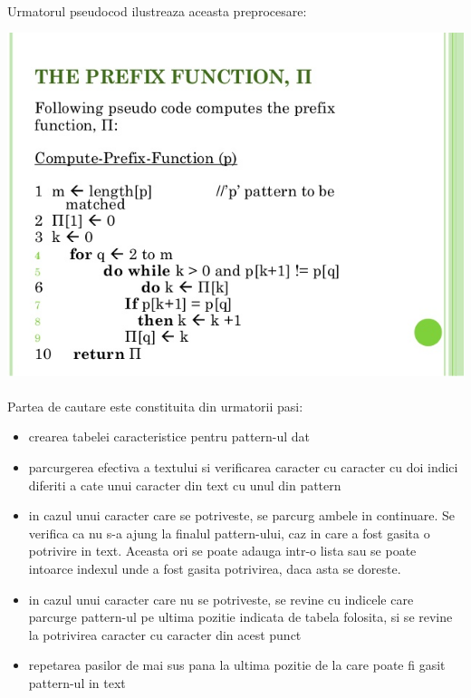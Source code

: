 \documentclass[runningheads]{llncs}
\begin{document}
\paragraph{} Urmatorul pseudocod ilustreaza aceasta preprocesare:
\begin{center}
\includegraphics[scale=0.4]{prep.jpg}
\end{center} 
\paragraph{} Partea de cautare este constituita din urmatorii pasi:
\begin{itemize}
\item crearea tabelei caracteristice pentru pattern-ul dat
\item parcurgerea efectiva a textului si verificarea caracter cu caracter cu doi indici diferiti a cate unui caracter din text cu unul din pattern
\item in cazul unui caracter care se potriveste, se parcurg ambele in continuare. Se verifica ca nu s-a ajung la finalul pattern-ului, caz in care a fost gasita o potrivire in text. Aceasta ori se poate adauga intr-o lista sau se poate intoarce indexul unde a fost gasita potrivirea, daca asta se doreste.
\item in cazul unui caracter care nu se potriveste, se revine cu indicele care parcurge pattern-ul pe ultima pozitie indicata de tabela folosita, si se revine la potrivirea caracter cu caracter din acest punct
\item repetarea pasilor de mai sus pana la ultima pozitie de la care poate fi gasit pattern-ul in text
\end{itemize}
\pagebreak
\end{document}

